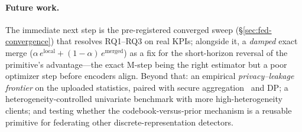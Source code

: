 \documentclass[11pt]{article}
\theoremstyle{plain}
\theoremstyle{definition}
\begin{document}
\paragraph{Future work.} The immediate next step is the pre-registered converged sweep
(\S\ref{sec:fed-convergence}) that resolves RQ1--RQ3 on real KPIs; alongside it, a
\emph{damped} exact merge ($\alpha\,e^{\text{local}}{+}(1{-}\alpha)\,e^{\text{merged}}$) as
a fix for the short-horizon reversal of the primitive's advantage---the exact M-step being
the right estimator but a poor optimizer step before encoders align. Beyond that: an
empirical \emph{privacy--leakage frontier} on the uploaded statistics, paired with secure
aggregation~\cite{bonawitz2017secure} and DP; a heterogeneity-controlled univariate
benchmark with more high-heterogeneity clients; and testing whether the
codebook-versus-prior mechanism is a reusable primitive for federating other
discrete-representation detectors.
\end{document}
